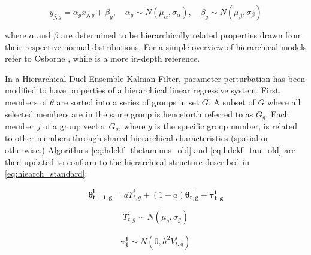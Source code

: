 \begin{equation}\label{eq:hiearch_standard}
y_{j,g} = \alpha_{g} x_{j,g} + \beta_{g}, \quad \alpha_{g} \sim N( \mu_{\alpha}, \sigma_{\alpha} ), \quad \beta_{g} \sim N( \mu_{\beta} , \sigma_{\beta} )
\end{equation}

where $\alpha$ and $\beta$ are determined to be hierarchically related properties drawn from their respective normal distributions. For a simple overview of hierarchical models refer to Osborne \cite{Osborne2000}, while \cite{Gelman2013} is a more in-depth reference.

In a Hierarchical Duel Ensemble Kalman Filter, parameter perturbation has been modified to have properties of a hierarchical linear regressive system. First, members of $\theta$ are sorted into a series of groups in set $G$. A subset of $G$ where all selected members are in the same group is henceforth referred to as $G_g$. Each member $j$ of a group vector $G_g$, where $g$ is the specific group number, is related to other members through shared hierarchical characteristics (spatial or otherwise.) Algorithms \eqref{eq:hdekf_thetaminus_old} and \eqref{eq:hdekf_tau_old} are then updated to conform to the hierarchical structure described in \eqref{eq:hiearch_standard}:

\begin{equation}\label{eq:hdekf_theta}
\mathbf{\theta_{t+1,g}^{i-}} = a \Upsilon_{t,g}^{i} + (1-a)\mathbf{\bar{\theta}_{t,g}^{+}} + \mathbf{\tau_{t,g}^{i}}
\end{equation}


\begin{equation}\label{eq:hdekf_tau}
\Upsilon_{t,g}^{i} \sim N( \mu_{g}, \sigma_{g} )
\end{equation}

\begin{equation}\label{eq:hdekf_tau}
\mathbf{\tau_{t}^{i}} \sim N(0, h^{2}V_{t,g}^{i})
\end{equation}


